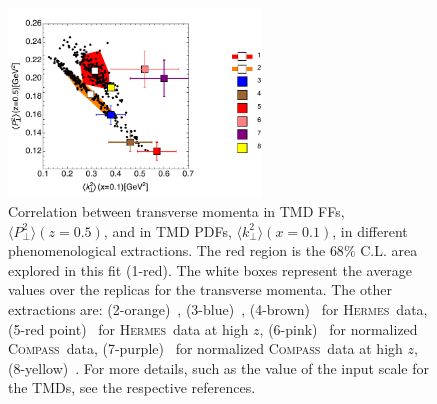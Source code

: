 \documentclass[aps,preprintnumbers,showpacs,nofootinbib,superscriptaddress,floatfix]{revtex4}
\newcommand{\hermes}{\textsc{Hermes}}
\newcommand{\compass}{\textsc{Compass}}
\begin{document}
\begin{figure}[h!]
\begin{center}
\includegraphics[width=0.60\textwidth]{plots/kT2_PT2_flav_indep}
\end{center}
\caption{Correlation between transverse momenta in TMD FFs, $\langle P_\perp^2 \rangle(z=0.5)$, and in TMD PDFs, $\langle k_\perp^2 \rangle(x=0.1)$, in different phenomenological extractions. 
The red region is the $68\%$ C.L. area explored in this fit (1-red). The white boxes represent the average values over the replicas for the transverse momenta. 
The other extractions are: (2-orange)~\cite{Signori:2013mda}, (3-blue)~\cite{Schweitzer:2010tt}, (4-brown)~\cite{Anselmino:2013lza} for \hermes\ data, (5-red point)~\cite{Anselmino:2013lza} for \hermes\ data at high $z$, (6-pink)~\cite{Anselmino:2013lza} for normalized \compass\ data, (7-purple)~\cite{Anselmino:2013lza} for normalized \compass\ data at high $z$, (8-yellow)~\cite{Echevarria:2014xaa}.  
For more details, such as the value of the input scale for the TMDs, see the respective references.} 
\label{f:kT2_vs_PT2}
\end{figure}
\end{document}
